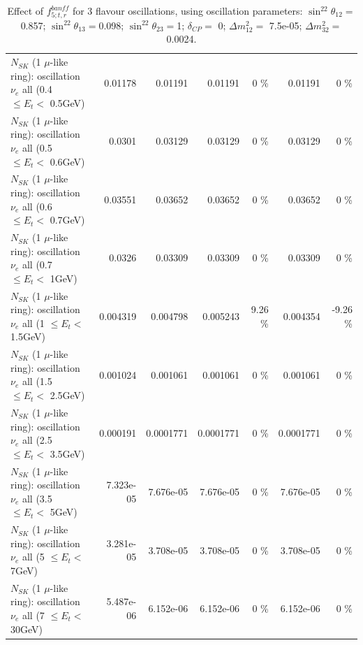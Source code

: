 \begin{table}
\begin{tabular}{| l | r | r | r  r | r  r |}
$N_{SK}$ (1 $\mu$-like ring): oscillation $\nu_{e}$ all (0.4 $\leq E_{t} <$ 0.5GeV) &         0.01178 &         0.01191 &         0.01191 &        0 \%  &         0.01191 &        0 \%  \\ 
$N_{SK}$ (1 $\mu$-like ring): oscillation $\nu_{e}$ all (0.5 $\leq E_{t} <$ 0.6GeV) &          0.0301 &         0.03129 &         0.03129 &        0 \%  &         0.03129 &        0 \%  \\ 
$N_{SK}$ (1 $\mu$-like ring): oscillation $\nu_{e}$ all (0.6 $\leq E_{t} <$ 0.7GeV) &         0.03551 &         0.03652 &         0.03652 &        0 \%  &         0.03652 &        0 \%  \\ 
$N_{SK}$ (1 $\mu$-like ring): oscillation $\nu_{e}$ all (0.7 $\leq E_{t} <$ 1GeV) &          0.0326 &         0.03309 &         0.03309 &        0 \%  &         0.03309 &        0 \%  \\ 
$N_{SK}$ (1 $\mu$-like ring): oscillation $\nu_{e}$ all (1 $\leq E_{t} <$ 1.5GeV) &        0.004319 &        0.004798 &        0.005243 &     9.26 \%  &        0.004354 &    -9.26 \%  \\ 
$N_{SK}$ (1 $\mu$-like ring): oscillation $\nu_{e}$ all (1.5 $\leq E_{t} <$ 2.5GeV) &        0.001024 &        0.001061 &        0.001061 &        0 \%  &        0.001061 &        0 \%  \\ 
$N_{SK}$ (1 $\mu$-like ring): oscillation $\nu_{e}$ all (2.5 $\leq E_{t} <$ 3.5GeV) &        0.000191 &       0.0001771 &       0.0001771 &        0 \%  &       0.0001771 &        0 \%  \\ 
$N_{SK}$ (1 $\mu$-like ring): oscillation $\nu_{e}$ all (3.5 $\leq E_{t} <$ 5GeV) &       7.323e-05 &       7.676e-05 &       7.676e-05 &        0 \%  &       7.676e-05 &        0 \%  \\ 
 $N_{SK}$ (1 $\mu$-like ring): oscillation $\nu_{e}$ all (5 $\leq E_{t} <$ 7GeV) &       3.281e-05 &       3.708e-05 &       3.708e-05 &        0 \%  &       3.708e-05 &        0 \%  \\ 
$N_{SK}$ (1 $\mu$-like ring): oscillation $\nu_{e}$ all (7 $\leq E_{t} <$ 30GeV) &       5.487e-06 &       6.152e-06 &       6.152e-06 &        0 \%  &       6.152e-06 &        0 \%  \\ 
\hline
\hline
\end{tabular}
\caption{ Effect of $f_{5; t, r}^{banff}$ for 3 flavour oscillations, using oscillation parameters:  $\sin^22\theta_{12} = $0.857; $\sin^22\theta_{13} = $0.098; $\sin^22\theta_{23} = $1; $\delta_{CP} = $        0; $\Delta m^2_{12} = $    7.5e-05; $\Delta m^2_{32} = $    0.0024. }
\label{tab:num_banff_05_1RmuT_3f_osc_t13:0.098}
\end{table}
